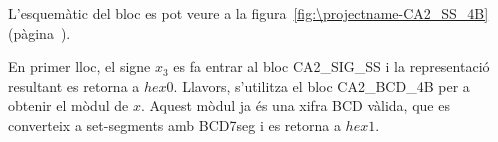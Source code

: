 L'esquemàtic del bloc es pot veure a la figura~\ref{fig:\projectname-CA2_SS_4B} (pàgina~\pageref{fig:\projectname-CA2_SS_4B}).

En primer lloc, el signe $x_3$ es fa entrar al bloc \textsf{CA2\_SIG\_SS} i la
representació resultant es retorna a $hex0$. Llavors, s'utilitza el bloc
\textsf{CA2\_BCD\_4B} per a obtenir el mòdul de $x$. Aquest mòdul ja és una xifra
BCD vàlida, que es converteix a set-segments amb \textsf{BCD7seg} i es retorna a
$hex1$.

\vspace{1cm}

